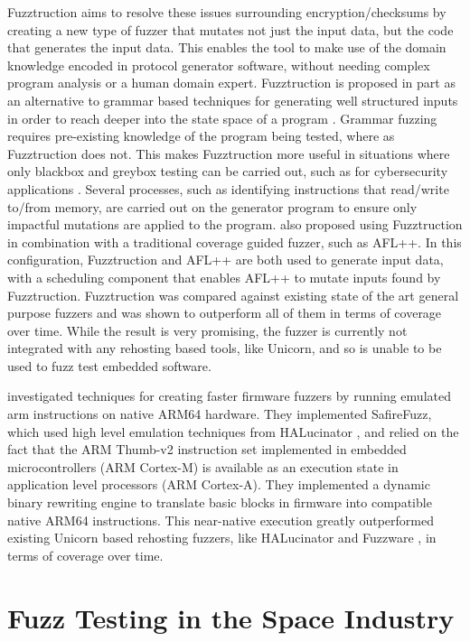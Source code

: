 \documentclass[../report.tex]{subfiles}
\begin{document}
Fuzztruction \citep{Fuzztruction_2023} aims to resolve these issues surrounding
encryption/checksums by creating a new type of fuzzer that mutates not just the
input data, but the code that generates the input data. This enables the tool
to make use of the domain knowledge encoded in protocol generator software, without
needing complex program analysis or a human domain expert. Fuzztruction is
proposed in part as an alternative to grammar based techniques for generating
well structured inputs in order to reach deeper into the state space of a
program \citep{Fuzztruction_2023}. Grammar fuzzing requires pre-existing
knowledge of the program being tested, where as Fuzztruction does not. This
makes Fuzztruction more useful in situations where only blackbox and greybox
testing can be carried out, such as for cybersecurity applications
\citep{Fuzztruction_2023}. Several processes, such as identifying instructions
that read/write to/from memory, are carried out on the generator program to
ensure only impactful mutations are applied to the program.
\citet{Fuzztruction_2023} also proposed using Fuzztruction in combination with
a traditional coverage guided fuzzer, such as AFL++. In this configuration,
Fuzztruction and AFL++ are both used to generate input data, with a scheduling
component that enables AFL++ to mutate inputs found by Fuzztruction.
Fuzztruction was compared against existing state of the art general purpose
fuzzers and was shown to outperform all of them in terms of coverage over time.
While the result is very promising, the fuzzer is currently not integrated with
any rehosting based tools, like Unicorn, and so is unable to be used to fuzz
test embedded software.

\citet{Seidel_2023} investigated techniques for creating faster firmware
fuzzers by running emulated arm instructions on native ARM64 hardware. They
implemented SafireFuzz, which used high level emulation techniques from
HALucinator \citep{HALucinator_2020}, and relied on the fact that the ARM
Thumb-v2 instruction set implemented in embedded microcontrollers (ARM
Cortex-M) is available as an execution state in application level processors
(ARM Cortex-A). They implemented a dynamic binary rewriting engine to translate
basic blocks in firmware into compatible native ARM64 instructions. This
near-native execution greatly outperformed existing Unicorn based rehosting
fuzzers, like HALucinator \citep{HALucinator_2020} and Fuzzware
\citep{Fuzzware_2022}, in terms of coverage over time.

\section{Fuzz Testing in the Space Industry}
\end{document}
